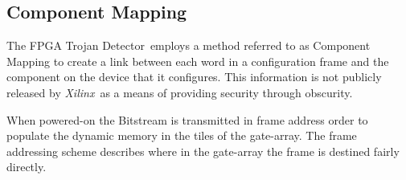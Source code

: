\documentclass[conference]{IEEEtran}
\newcommand{\Xilinx}{\textit{\gls{Xilinx}}~}
\newcommand{\Name}{\acrshort{FPGA} Trojan Detector}
\newcommand{\NameNoPeriod}{\Name~}
\begin{document}

\subsection{Component Mapping} \label{sec:tileMapping}
The \NameNoPeriod employs a method referred to as Component Mapping to create a link between each word in a configuration frame and the component on the device that it configures.
This information is not publicly released by \Xilinx as a means of providing security through obscurity.

When powered-on the \gls{Bitstream} is transmitted in frame address order to populate the dynamic memory in the tiles of the gate-array.
The frame addressing scheme describes where in the gate-array the frame is destined fairly directly.
\end{document}
